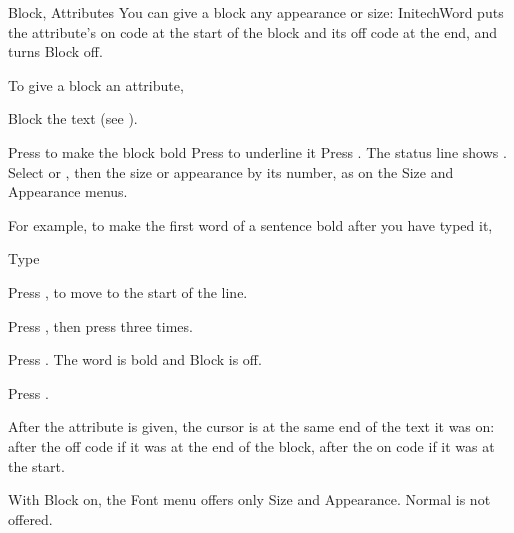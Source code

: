 \begin{Feature}{Block, Attributes}
You can give a block any appearance or size: InitechWord puts the
attribute's on code at the start of the block and its off code at the end,
and turns Block off.

To give a block an attribute,
\begin{WPSteps}
\item Block the text (see ).
\item Press  to make the block bold
\Or
Press  to underline it
\Or
Press .  The status line shows
.  Select  or
, then the size or appearance by its number, as on the
Size and Appearance menus.
\end{WPSteps}

For example, to make the first word of a sentence bold after you have
typed it,
\begin{WPSteps}
\item Type 
\item Press ,  to move to the start of the line.
\item Press , then press  three times.
\item Press .  The word is bold and Block is off.
\item Press .
\end{WPSteps}
\EndReplay

\Notes
{}
After the attribute is given, the cursor is at the same end of the text it
was on: after the off code if it was at the end of the block, after the on
code if it was at the start.

With Block on, the Font menu offers only Size and Appearance.  Normal is not
offered.

\end{Feature}

